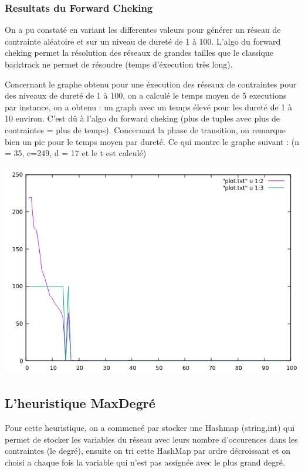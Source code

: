 \documentclass[oneside,13pt,a4paper]{article}
\begin{document}
\subsubsection{Resultats du Forward Cheking }

On a pu constaté en variant les differentes valeurs pour générer un réseau de contrainte aléatoire et sur un niveau de dureté de 1 à 100. L'algo du forward cheking permet la résolution des réseaux de grandes tailles que le classique backtrack ne permet de résoudre (temps d'éxecution très long).

Concernant le graphe obtenu pour une éxecution des réseaux de contraintes pour des niveaux de dureté de 1 à 100, on a calculé le temps moyen de 5 executions par instance, on a obtenu : un graph avec un temps élevé pour les dureté de 1 à 10 environ. C'est dû à l'algo du forward cheking (plus de tuples avec plus de contraintes = plus de temps). Concernant la phase de transition, on remarque bien un pic pour le temps moyen par dureté. Ce qui montre le graphe  suivant : (n = 35, c=249, d = 17 et le t est calculé)

\includegraphics{img/FC.png}


\subsection{L'heuristique MaxDegré}

Pour cette heuristique, on a commencé par stocker une Hashmap (string,int) qui permet de stocker les variables du réseau avec leurs nombre d'occurences dans les contraintes (le degré), ensuite on tri cette HashMap par ordre décroissant et on choisi a chaque fois la variable qui n'est pas assignée avec le plus grand degré.
\end{document}
